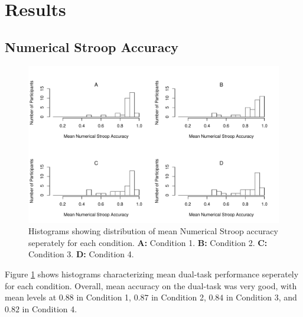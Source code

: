 \section*{Results} 


\subsection*{Numerical Stroop Accuracy} 
\begin{figure}[t]
    \centering \includegraphics[width=1.0\textwidth]{../figures/fig_exc_dual.pdf}
    \caption{
      Histograms showing distribution of mean Numerical Stroop accuracy
      seperately for each condition. 
      \textbf{A:} Condition 1.
      \textbf{B:} Condition 2.
      \textbf{C:} Condition 3.
      \textbf{D:} Condition 4.
    }
    \label{fig:exc_dual}
\end{figure}

Figure \ref{fig:exc_dual} shows histograms characterizing mean dual-task performance
seperately for each condition. Overall, mean accuracy on the dual-task was very
good, with mean levels at $0.88$ in Condition 1, $0.87$ in Condition 2, $0.84$ in
Condition 3, and $0.82$ in Condition 4.

